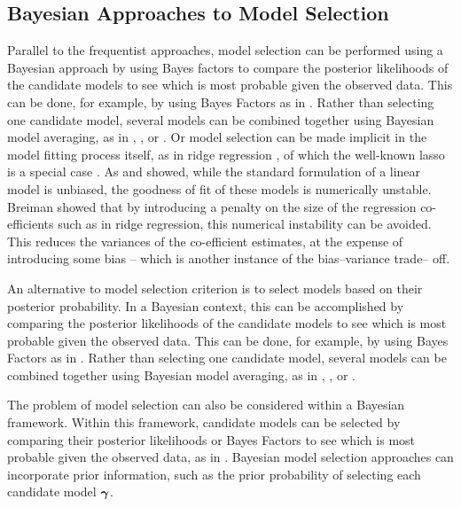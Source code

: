 \subsection{Bayesian Approaches to Model Selection}
Parallel to the frequentist approaches, model selection can be performed using a Bayesian approach by using
Bayes factors to compare the posterior likelihoods of the candidate models to see which is most probable given
the observed data. This can be done, for example, by using Bayes Factors as in \citep{Kass1993}. Rather than
selecting one candidate model, several models can be combined together using Bayesian model  averaging, as in
\citep{Hoeting1999}, \citep{Raftery1997}, \citep{Fernandez2001} or \citep{Papaspiliopoulos2016}. Or model
selection can be made implicit in the model fitting process itself, as in ridge regression
\citep{Casella1980}, of which the well-known lasso is a special case \citep{Tibshirani1996}. As
\citep{Breiman1996} and \citep{Efron2013} showed, while  the standard formulation of a linear model is
unbiased, the goodness of fit of these models is numerically  unstable. Breiman showed that by introducing a
penalty on the size of the regression co- efficients such as  in ridge regression, this numerical instability
can be avoided. This reduces the variances of the co-efficient estimates, at the expense of introducing some
bias -- which is another instance of the bias--variance trade-- off.

An alternative to model selection criterion is to select models based on their posterior probability. In a
Bayesian context, this can be accomplished by comparing the posterior likelihoods of the candidate models to
see which is most probable given the observed data. This can be done, for example, by using Bayes Factors as
in \cite{Kass1993}. Rather than selecting one candidate model, several models can be combined together using
Bayesian model averaging, as in \cite{Hoeting1999}, \cite{Raftery1997}, \cite{Fernandez2001} or
\cite{Papaspiliopoulos2016}.

The problem of model selection can also be considered within a Bayesian framework. Within this framework,
candidate models can be selected by comparing their posterior likelihoods or Bayes Factors to see which is
most probable given the observed data, as in \cite{Kass1993}. Bayesian model selection approaches can
incorporate prior information, such as the prior probability of selecting each candidate model ${\boldsymbol \gamma}$.

